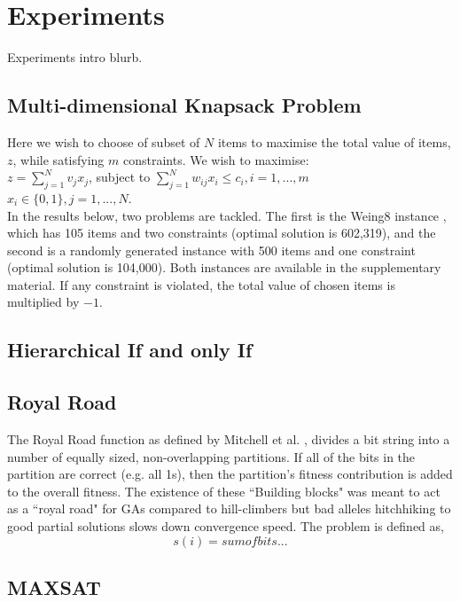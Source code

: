 \documentclass[runningheads,a4paper]{llncs}
\begin{document}
\section{Experiments}
\label{sec:experiments}
Experiments intro blurb.

\subsection{Multi-dimensional Knapsack Problem}
Here we wish to choose of subset of \(N\) items to maximise the total value of items, \(z\), while satisfying \(m\) constraints. We wish to maximise:
\vspace{2mm}\\
\(z = \sum_{j=1}^{N} v_jx_j\), subject to \(\sum_{j=1}^{N} w_{ij}x_i \leq c_i, i = 1, ..., m\)
\vspace{2mm}\\
\(x_i \in \{0,1\}, j = 1, ..., N\).
\vspace{2mm}\\
In the results below, two problems are tackled. The first is the Weing8 instance \cite{ref}, which has 105 items and two constraints (optimal solution is 602,319), and the second is a randomly generated instance with 500 items and one constraint (optimal solution is 104,000). Both instances are available in the supplementary material. If any constraint is violated, the total value of chosen items is multiplied by \(-1\).

\subsection{Hierarchical If and only If}

\subsection{Royal Road}
The Royal Road function as defined by Mitchell et al. \cite{mitchell}, divides a bit string into a number of  equally sized, non-overlapping partitions. If all of the bits in the partition are correct (e.g. all 1s), then the partition's fitness contribution is added to the overall fitness. The existence of these ``Building blocks" was meant to act as a ``royal road" for GAs compared to hill-climbers but bad alleles hitchhiking to good partial solutions slows down convergence speed. The problem is defined as,
\\
\[
s(i) = sum of bits...
\]
 
\subsection{MAXSAT}
\end{document}
